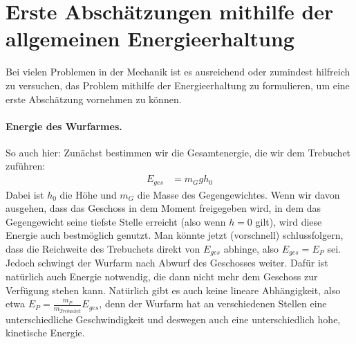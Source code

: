 \label{energie-allgemein}
\section{Erste Abschätzungen mithilfe der allgemeinen Energieerhaltung}

Bei vielen Problemen in der Mechanik ist es ausreichend oder zumindest hilfreich zu versuchen, das Problem mithilfe der Energieerhaltung zu formulieren, um eine erste Abschätzung vornehmen zu können. 

\paragraph{Energie des Wurfarmes.}
So auch hier: Zunächst bestimmen wir die Gesamtenergie, die wir dem Trebuchet zuführen:
\begin{align}
\label{gesammtenergie}
E_{ges} &= m_G g h_0 %
\end{align}
Dabei ist $h_0$ die Höhe und $m_G$ die Masse des Gegengewichtes. Wenn wir davon ausgehen, dass das Geschoss in dem Moment freigegeben wird, in dem das Gegengewicht seine tiefste Stelle erreicht (also wenn $h=0$ gilt), wird diese Energie auch bestmöglich genutzt.
Man könnte jetzt (vorschnell) schlussfolgern, dass die Reichweite des Trebuchets direkt von $E_{ges}$ abhinge, also $E_{ges}=E_P$ sei. Jedoch schwingt der Wurfarm nach Abwurf des Geschosses weiter. Dafür ist natürlich auch Energie notwendig, die dann nicht mehr dem Geschoss zur Verfügung stehen kann.
Natürlich gibt es auch keine lineare Abhängigkeit, also etwa $E_P=\frac{m_P}{{m_{Trebuchet}}} E_{ges}$, denn der Wurfarm hat an verschiedenen Stellen eine unterschiedliche Geschwindigkeit und deswegen auch eine unterschiedlich hohe, kinetische Energie.

